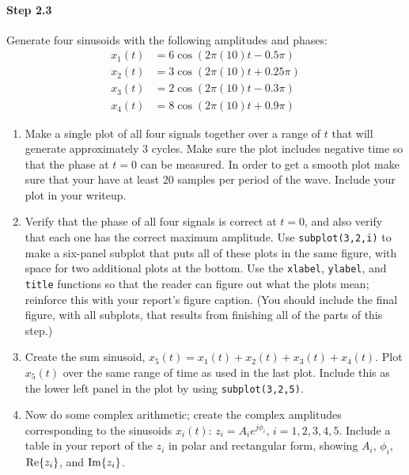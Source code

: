 \paragraph{Step 2.3} Generate four sinusoids with the following
amplitudes and phases:
\begin{align}
x_1(t) &= 6 \cos(2\pi(10)t - 0.5\pi) \\
x_2(t) &= 3 \cos(2\pi(10)t + 0.25\pi) \\
x_3(t) &= 2 \cos(2\pi(10)t - 0.3\pi) \\
x_4(t) &= 8 \cos(2\pi(10)t + 0.9\pi) 
\end{align}

\begin{enumerate}\renewcommand{\theenumi}{\alph{enumi}}
\item Make a single plot of all four signals together over a range of
  $t$ that will generate approximately 3 cycles. Make sure the plot
  includes negative time so that the phase at $t = 0$ can be
  measured. In order to get a smooth plot make sure that your have at
  least 20 samples per period of the wave. Include your plot in your
  writeup.

\item Verify that the phase of all four signals is correct at $t = 0$,
  and also verify that each one has the correct maximum amplitude. Use
  \verb|subplot(3,2,i)| to make a six-panel subplot that puts all of
  these plots in the same figure, with space for two additional plots
  at the bottom. Use the \verb|xlabel|, \verb|ylabel|, and
  \verb|title| functions so that the reader can figure out what the
  plots mean; reinforce this with your report's figure caption. (You
  should include the final figure, with all subplots, that results
  from finishing all of the parts of this step.)

\item Create the sum sinusoid,
  $x_5(t)=x_1(t)+x_2(t)+x_3(t)+x_4(t)$. Plot $x_5(t)$ over the same
  range of time as used in the last plot. Include this as the lower
  left panel in the plot by using \verb|subplot(3,2,5)|.

\item Now do some complex arithmetic; create the complex amplitudes
  corresponding to the sinusoids $x_i(t)$: $z_i = A_ie^{j\phi_i}$,
  $i=1,2,3,4,5$. Include a table in your report of the $z_i$ in polar
  and rectangular form, showing $A_i$, $\phi_i$, $\operatorname{Re}\{z_i\}$, and
  $\operatorname{Im}\{z_i\}$.
\end{enumerate}


